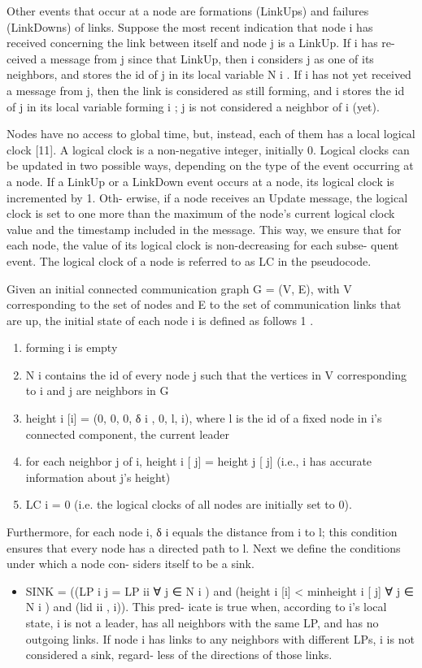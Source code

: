 Other events that occur at a node are formations
(LinkUps) and failures (LinkDowns) of links. Suppose the
most recent indication that node i has received concerning
the link between itself and node j is a LinkUp. If i has re-
ceived a message from j since that LinkUp, then i considers
j as one of its neighbors, and stores the id of j in its local
variable N i . If i has not yet received a message from j, then
the link is considered as still forming, and i stores the id of j
in its local variable forming i ; j is not considered a neighbor
of i (yet).

Nodes have no access to global time, but, instead, each
of them has a local logical clock [11]. A logical clock is
a non-negative integer, initially 0. Logical clocks can be
updated in two possible ways, depending on the type of the
event occurring at a node. If a LinkUp or a LinkDown event
occurs at a node, its logical clock is incremented by 1. Oth-
erwise, if a node receives an Update message, the logical
clock is set to one more than the maximum of the node’s
current logical clock value and the timestamp included in
the message. This way, we ensure that for each node, the
value of its logical clock is non-decreasing for each subse-
quent event. The logical clock of a node is referred to as LC
in the pseudocode.

Given an initial connected communication graph G =
(V, E), with V corresponding to the set of nodes and E to
the set of communication links that are up, the initial state
of each node i is defined as follows 1 .
\begin{enumerate}
\item forming i is empty
\item N i contains the id of every node j such that the vertices
in V corresponding to i and j are neighbors in G
\item height i [i] = (0, 0, 0, δ i , 0, l, i), where l is the id of a
fixed node in i’s connected component, the current
leader
\item for each neighbor j of i, height i [ j] = height j [ j] (i.e., i
has accurate information about j’s height)
\item LC i = 0 (i.e. the logical clocks of all nodes are initially
set to 0).
\end{enumerate}
Furthermore, for each node i, δ i equals the distance from i
to l; this condition ensures that every node has a directed
path to l.
Next we define the conditions under which a node con-
siders itself to be a sink.
\begin{itemize}
\item SINK = ((LP i j = LP ii ∀ j ∈ N i ) and (height i [i] <
min{height i [ j] ∀ j ∈ N i }) and (lid ii , i)). This pred-
icate is true when, according to i’s local state, i is not
a leader, has all neighbors with the same LP, and has
no outgoing links. If node i has links to any neighbors
with different LPs, i is not considered a sink, regard-
less of the directions of those links.
\end{itemize}
